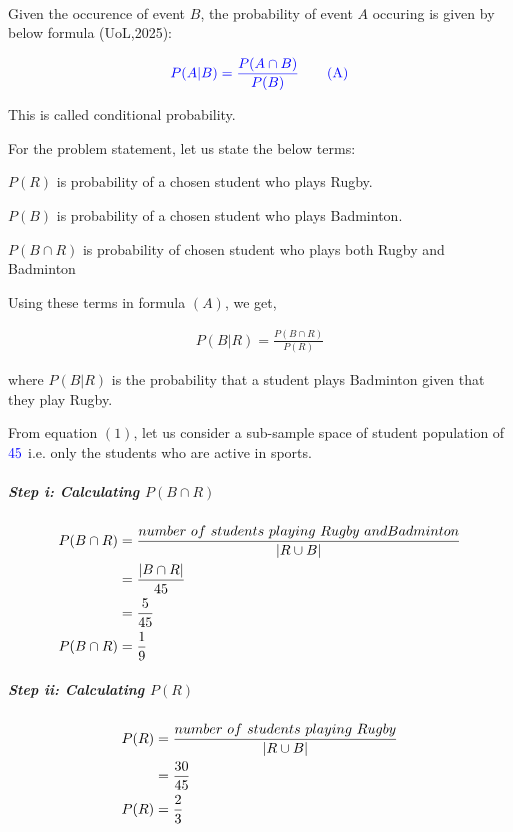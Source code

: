 \documentclass[a4paper]{report}
\begin{document}
\paragraph{}

Given the occurence of event $B$, the probability of event $A$ occuring is given by below formula (UoL,2025):

\begin{equation}
    \color{blue} P(A|B)=\frac{P(A\cap B)}{P(B)} \tag{A}
\end{equation}

This is called conditional probability.

For the problem statement, let us state the below terms:

$P(R)$ is probability of a chosen student who plays Rugby.

$P(B)$ is probability of a chosen student who plays Badminton.

$P(B\cap R)$ is probability of chosen student who plays both Rugby and Badminton

Using these terms in formula $(A)$, we get,

\begin{align}
    P(B|R)=\frac{P(B\cap R)}{P(R)}
\end{align}

where $P(B|R)$ is the probability that a student plays Badminton given that they play Rugby.

From equation $(1)$, let us consider a sub-sample space of student population of $\color{blue}45$ i.e. only the students who are active in sports.

\subparagraph{Step i: Calculating $P(B\cap R)$}


\begin{align}
    \notag P(B\cap R) &= \frac{number\ of\ students\ playing\ Rugby\ and Badminton}{|R\cup B|} \\
    \notag &=\frac{|B\cap R|}{45} \\
    \notag &=\frac{5}{45} \\
    P(B\cap R) &= \frac{1}{9}
\end{align}


\subparagraph{Step ii: Calculating $P(R)$}

\begin{align}
    \notag P(R)&=\frac{number\ of\ students\ playing\ Rugby}{|R\cup B|} \\
    \notag &=\frac{30}{45} \\
    P(R)&=\frac{2}{3}
\end{align}
\end{document}
